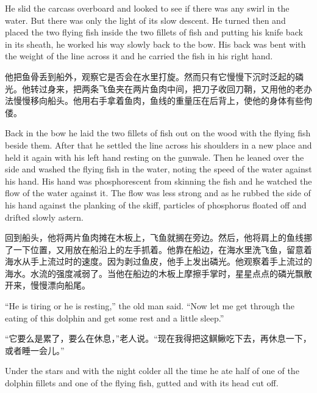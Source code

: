 \begin{paracol}{2}
\switchcolumn*

He slid the carcass overboard and looked to see if there was any swirl in
the water. But there was only the light of its slow \gls{descent}. He turned
then and placed the two flying fish inside the two \glspl{fillet} of fish
and putting his knife back in its sheath, he worked his way slowly back to
the bow. His back was \gls{bent} with the weight of the line across it and
he carried the fish in his right hand.

\switchcolumn

他把鱼骨丢到船外，观察它是否会在水里打旋。然而只有它慢慢下沉时泛起的磷光。他转过身来，把两条飞鱼夹在两片鱼肉中间，把刀子收回刀鞘，又用他的老办法慢慢移向船头。他用右手拿着鱼肉，鱼线的重量压在后背上，使他的身体有些佝偻。

\switchcolumn*

Back in the bow he laid the two fillets of fish out on the wood with the
flying fish beside them. After that he settled the line across his shoulders
in a new place and held it again with his left hand resting on the gunwale.
Then he leaned over the side and washed the flying fish in the water,
\gls{noting} the speed of the water against his hand. His hand was
phosphorescent from skinning the fish and he watched the flow of the water
against it. The flow was less strong and as he rubbed the side of his hand
against the planking of the skiff, \glspl{particle} of \gls{phosphorus}
floated off and drifted slowly \gls{astern}.

\switchcolumn

回到船头，他将两片鱼肉摊在木板上，飞鱼就搁在旁边。然后，他将肩上的鱼线挪了一下位置，又用放在船沿上的左手抓着。他靠在船边，在海水里洗飞鱼，留意着海水从手上流过时的速度。因为剥过鱼皮，他手上发出磷光。他观察着手上流过的海水。水流的强度减弱了。当他在船边的木板上摩擦手掌时，星星点点的磷光飘散开来，慢慢漂向船尾。

\switchcolumn*

``He is tiring or he is resting,'' the old man said. ``Now let me get
through the eating of this dolphin and get some rest and a little sleep.''

\switchcolumn

“它要么是累了，要么在休息，”老人说。“现在我得把这鲯鳅吃下去，再休息一下，或者睡一会儿。”

\switchcolumn*

Under the stars and with the night colder all the time he ate half of one
of the dolphin fillets and one of the flying fish, gutted and with its head
cut off.


\end{paracol}
